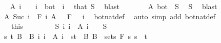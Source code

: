 \begin{isabellebody}
\ \isamarkupfalse%
\ {\isachardoublequoteopen}A\ i\ {\isacharequal}{\kern0pt}\ {\isacharbraceleft}{\kern0pt}{\isacharbraceright}{\kern0pt}{\isachardoublequoteclose}\ \ {\isachardoublequoteopen}i\ {\isasymnoteq}\ bot{\isachardoublequoteclose}\ \ i\ \isamarkupfalse%
\ that\ S\ \isamarkupfalse%
\ blast\isanewline
\ \ \ \ \isamarkupfalse%
\ \isamarkupfalse%
\ {\isachardoublequoteopen}A\ bot\ {\isacharequal}{\kern0pt}\ S{\isachardoublequoteclose}\ \isamarkupfalse%
\ S\ \isamarkupfalse%
\ blast\isanewline
\ \ \ \ \isamarkupfalse%
\ \isamarkupfalse%
\ {\isachardoublequoteopen}A\ {\isacharparenleft}{\kern0pt}Suc\ i{\isacharparenright}{\kern0pt}\ {\isasymin}\ F\ i{\isachardoublequoteclose}\ {\isachardoublequoteopen}A\ {}\ {\isasymin}\ F\ {}{\isachardoublequoteclose}\ \ i\ \isamarkupfalse%
\ bot{\isacharunderscore}{\kern0pt}nat{\isacharunderscore}{\kern0pt}def\ \isamarkupfalse%
\ {\isacharparenleft}{\kern0pt}auto\ simp\ add{\isacharcolon}{\kern0pt}\ bot{\isacharunderscore}{\kern0pt}nat{\isacharunderscore}{\kern0pt}def{\isacharparenright}{\kern0pt}\isanewline
\ \ \isacommand{{\isacharbraceright}{\kern0pt}}\isamarkupfalse%
\isanewline
\ \ \isamarkupfalse%
\ {\isacharasterisk}{\kern0pt}\ {\isacharequal}{\kern0pt}\ this\isanewline
\ \ \isacommand{{\isacharbraceleft}{\kern0pt}}\isamarkupfalse%
\isanewline
\ \ \ \ \isamarkupfalse%
\ {\isachardoublequoteopen}{\isasymnexists}S{\isachardot}{\kern0pt}\ {\isacharparenleft}{\kern0pt}{\isasymUnion}i{\isachardot}{\kern0pt}\ {\isacharbraceleft}{\kern0pt}i{\isacharbraceright}{\kern0pt}\ {\isasymtimes}\ A\ i{\isacharparenright}{\kern0pt}\ {\isacharequal}{\kern0pt}\ {\isacharbraceleft}{\kern0pt}{}{\isacharbraceright}{\kern0pt}\ {\isasymtimes}\ S{\isachardoublequoteclose}\isanewline
\ \ \ \ \isamarkupfalse%
\ \isamarkupfalse%
\ s\ t\ B\ \ B{\isacharcolon}{\kern0pt}\ {\isachardoublequoteopen}{\isacharparenleft}{\kern0pt}{\isasymUnion}i{\isachardot}{\kern0pt}\ {\isacharbraceleft}{\kern0pt}i{\isacharbraceright}{\kern0pt}\ {\isasymtimes}\ A\ i{\isacharparenright}{\kern0pt}\ {\isacharequal}{\kern0pt}\ {\isacharbraceleft}{\kern0pt}s{\isacharless}{\kern0pt}{\isachardot}{\kern0pt}{\isachardot}{\kern0pt}t{\isacharbraceright}{\kern0pt}\ {\isasymtimes}\ B{\isachardoublequoteclose}\ {\isachardoublequoteopen}B\ {\isasymin}\ sets\ {\isacharparenleft}{\kern0pt}F\ s{\isacharparenright}{\kern0pt}{\isachardoublequoteclose}\ {\isachardoublequoteopen}s\ {\isacharless}{\kern0pt}\ t{\isachardoublequoteclose}\ \isamarkupfalse%

\end{isabellebody}
